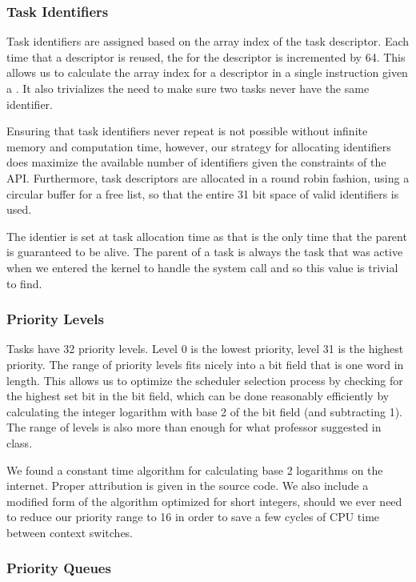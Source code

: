 \documentclass[pdftex,10pt,a4paper]{article}
\begin{document}
\subsubsection*{Task Identifiers}

Task identifiers are assigned based on the array index of the task
descriptor. Each time that a descriptor is reused, the  for
the descriptor is incremented by 64. This allows us to calculate the
array index for a descriptor in a single instruction given a
. It also trivializes the need to make sure two tasks never
have the same identifier.

Ensuring that task identifiers never repeat is not possible without
infinite memory and computation time, however, our strategy for
allocating identifiers does maximize the available number of
identifiers given the constraints of the API. Furthermore, task
descriptors are allocated in a round robin fashion, using a circular
buffer for a free list, so that the entire 31 bit space of valid
identifiers is used.

The  identier is set at task allocation time as that is
the only time that the parent is guaranteed to be alive. The parent of
a task is always the task that was active when we entered the kernel
to handle the system call and so this value is trivial to find.

\subsubsection*{Priority Levels}

Tasks have 32 priority levels. Level 0 is the lowest priority, level
31 is the highest priority. The range of priority levels fits nicely
into a bit field that is one word in length. This allows us to
optimize the scheduler selection process by checking for the highest
set bit in the bit field, which can be done reasonably efficiently by
calculating the integer logarithm with base 2 of the bit field (and
subtracting 1). The range of levels is also more than enough for what
professor suggested in class.

We found a constant time algorithm for calculating base 2 logarithms
on the internet. Proper attribution is given in the source code. We
also include a modified form of the algorithm optimized for short
integers, should we ever need to reduce our priority range to 16 in
order to save a few cycles of CPU time between context switches.

\subsubsection*{Priority Queues}
\end{document}
